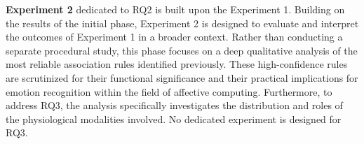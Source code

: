 \documentclass{isd}
\begin{document}
{%
\textbf{Experiment 2} dedicated to RQ2 is built upon the Experiment 1. Building on the results of the initial phase, Experiment 2 is designed to evaluate and interpret the outcomes of Experiment 1 in a broader context. Rather than conducting a separate procedural study, this phase focuses on a deep qualitative analysis of the most reliable association rules identified previously. These high-confidence rules are scrutinized for their functional significance and their practical implications for emotion recognition within the field of affective computing. Furthermore, to address RQ3, the analysis specifically investigates the distribution and roles of the physiological modalities involved. No dedicated experiment is designed for RQ3. 


}
\end{document}
